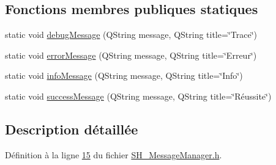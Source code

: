 \subsection*{Fonctions membres publiques statiques}
\begin{DoxyCompactItemize}
\item 
static void \hyperlink{classSH__MessageManager_a379f2aa0a590a5add34dbe91f98b2ff7}{debug\-Message} (Q\-String message, Q\-String title=\char`\"{}Trace\char`\"{})
\item 
static void \hyperlink{classSH__MessageManager_a0cb4f06cf67539457482ba1c8544eb06}{error\-Message} (Q\-String message, Q\-String title=\char`\"{}Erreur\char`\"{})
\item 
static void \hyperlink{classSH__MessageManager_a0b35c2f96e6d69934bf7f7c1e2172ea9}{info\-Message} (Q\-String message, Q\-String title=\char`\"{}Info\char`\"{})
\item 
static void \hyperlink{classSH__MessageManager_a829b465beb548a78616c0c97439bf720}{success\-Message} (Q\-String message, Q\-String title=\char`\"{}Réussite\char`\"{})
\end{DoxyCompactItemize}


\subsection{Description détaillée}


Définition à la ligne \hyperlink{SH__MessageManager_8h_source_l00015}{15} du fichier \hyperlink{SH__MessageManager_8h_source}{S\-H\-\_\-\-Message\-Manager.\-h}.



